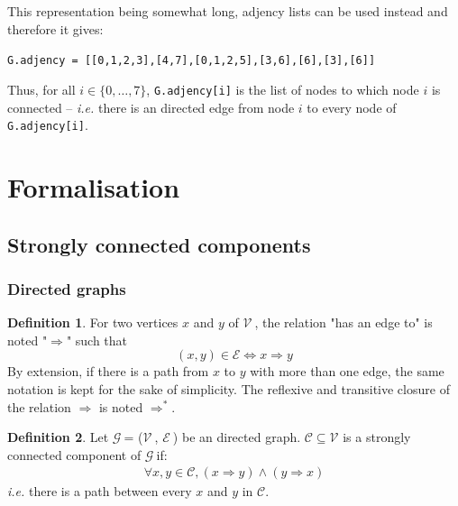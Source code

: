 \documentclass[a4 paper, 12pt]{article}
\theoremstyle{definition}
\def\GG{$\mathcal{G}~$}
\def\VV{$\mathcal{V}~$}
\def\EE{$\mathcal{E}~$}
\newtheorem{definition}{Definition}
\begin{document}
This representation being somewhat long, adjency lists can be used instead and therefore it gives:
\begin{center}
    \texttt{G.adjency = [[0,1,2,3],[4,7],[0,1,2,5],[3,6],[6],[3],[6]]}
\end{center}
Thus, for all $i \in \{0,\ldots,7\}$, \texttt{G.adjency[i]} is the list of nodes to which node $i$ is connected -- \textit{i.e.} there is an directed edge from node $i$ to every node of \texttt{G.adjency[i]}.
\pagebreak

\section{Formalisation}
\subsection{Strongly connected components}
\subsubsection{Directed graphs}\label{sec:directedgraphs}
\begin{definition}
    For two vertices $x$ and $y$ of \VV, the relation "has an edge to" is noted "$\Rightarrow$" such that
    \begin{equation*}
        (x, y) \in \mathcal{E} \Longleftrightarrow x \Rightarrow y
    \end{equation*}
    By extension, if there is a path from $x$ to $y$ with more than one edge, the same notation is kept for the sake of simplicity.
    The reflexive and transitive closure of the relation $\Rightarrow$ is noted $\Rightarrow^*$.
\end{definition}

\begin{definition}
    Let \GG = (\VV, \EE) be an directed graph.
$\mathcal{C} \subseteq \mathcal{V}$ is a strongly connected component of \GG if:
\begin{gather*}
    \forall x, y \in \mathcal{C}, (x \Rightarrow y) \wedge (y \Rightarrow x)
\end{gather*}
\textit{i.e.} there is a path between every $x$ and $y$ in $\mathcal{C}$.\\

\end{definition}
\end{document}
